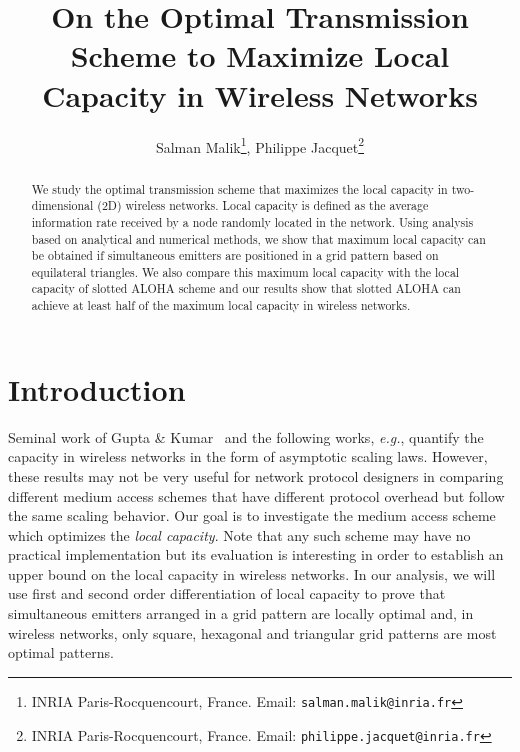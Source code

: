 \documentclass[12pt,english]{article}
\begin{document}
\def\ss{\sigma}
\def\fpzi{\frac{\partial}{\partial z_i}}
\def\fpzj{\frac{\partial}{\partial z_j}}
\def\BM{{\bf M}}
\def\BI{{\bf I}}
\def\BA{{\bf A}}
\def\BB{{\bf B}}
\def\E{{\bf E}}
\def\BD{{\bf D}}
\def\BT{{\bf T}}
\def\BX{{\bf X}}
\def\BU{{\bf U}}
\def\Bu{{\bf u}}
\def\BV{{\bf V}}
\def\Bv{{\bf v}}
\def\BI{\hbox{I}}
\def\BJ{\hbox{J}}
\def\det{\hbox{\rm det}}
\def\tr{\hbox{\rm tr}}
\def\fpx{\frac{\partial}{\partial x}}
\def\fpy{\frac{\partial}{\partial y}}
\def\det{\hbox{\rm det}}

\title{On the Optimal Transmission Scheme to Maximize Local Capacity in Wireless Networks}

\author{
Salman Malik\footnote{INRIA Paris-Rocquencourt, France. Email: \texttt{salman.malik@inria.fr}}, 
Philippe Jacquet\footnote{INRIA Paris-Rocquencourt, France. Email: \texttt{philippe.jacquet@inria.fr}}
}
\date{}

\maketitle

\begin{abstract}

We study the optimal transmission scheme that maximizes the local capacity in two-dimensional (2D) wireless networks. Local capacity is defined as the average information rate received by a node randomly located in the network. Using analysis based on analytical and numerical methods, we show that maximum local capacity can be obtained if simultaneous emitters are positioned in a grid pattern based on equilateral triangles. We also compare this maximum local capacity with the local capacity of slotted ALOHA scheme and our results show that slotted ALOHA can achieve at least half of the maximum local capacity in wireless networks.

\end{abstract}

\section{Introduction}
\label{sec:intro}

Seminal work of Gupta \& Kumar~\cite{Gupta:Kumar} and the following works, {\it e.g.}, \cite{scaling,scaling2} quantify the capacity in wireless networks in the form of asymptotic scaling laws. However, these results may not be very useful for network protocol designers in comparing different medium access schemes that have different protocol overhead but follow the same scaling behavior. Our goal is to investigate the medium access scheme which optimizes the {\em local capacity}. Note that any such scheme may have no practical implementation but its evaluation is interesting in order to establish an upper bound on the local capacity in wireless networks. In our analysis, we will use first and second order differentiation of local capacity to prove that simultaneous emitters arranged in a grid pattern are locally optimal and, in  wireless networks, only square, hexagonal and triangular grid patterns are most optimal patterns.  
\end{document}
